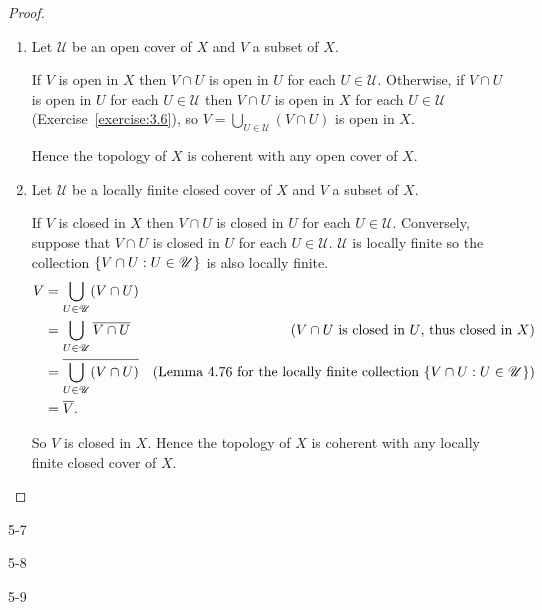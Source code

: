 \begin{proof}
	\begin{enumerate}[label={(\alph*)}]
		\item Let $\mathscr{U}$ be an open cover of $X$ and $V$ a subset of $X$.

		      If $V$ is open in $X$ then $V\cap U$ is open in $U$ for each $U\in\mathscr{U}$. Otherwise, if $V\cap U$ is open in $U$ for each $U\in\mathscr{U}$ then $V\cap U$ is open in $X$ for each $U\in\mathscr{U}$ (Exercise~\ref{exercise:3.6}), so $V = \bigcup_{U\in\mathscr{U}}(V\cap U)$ is open in $X$.

		      Hence the topology of $X$ is coherent with any open cover of $X$.
		\item Let $\mathscr{U}$ be a locally finite closed cover of $X$ and $V$ a subset of $X$.

		      If $V$ is closed in $X$ then $V\cap U$ is closed in $U$ for each $U\in\mathscr{U}$. Conversely, suppose that $V\cap U$ is closed in $U$ for each $U\in\mathscr{U}$. $\mathscr{U}$ is locally finite so the collection $\left\{{ V\cap U : U\in\mathscr{U} }\right\}$ is also locally finite.
		      \begin{align*}
			      V & = \bigcup_{U\in\mathscr{U}} (V\cap U)                                                                                                        \\
			        & = \bigcup_{U\in\mathscr{U}} \overline{V\cap U}   & \text{($V\cap U$ is closed in $U$, thus closed in $X$)}                                   \\
			        & = \overline{\bigcup_{U\in\mathscr{U}} (V\cap U)} & \text{(Lemma 4.76 for the locally finite collection $\left\{{ V\cap U : U\in\mathscr{U} }\right\}$)} \\
			        & = \overline{V}.
		      \end{align*}

		      So $V$ is closed in $X$. Hence the topology of $X$ is coherent with any locally finite closed cover of $X$.
	\end{enumerate}
\end{proof}

\begin{problem}{5-7}\label{problem:5-7}
\end{problem}

\begin{problem}{5-8}\label{problem:5-8}
\end{problem}

\begin{problem}{5-9}\label{problem:5-9}
\end{problem}


